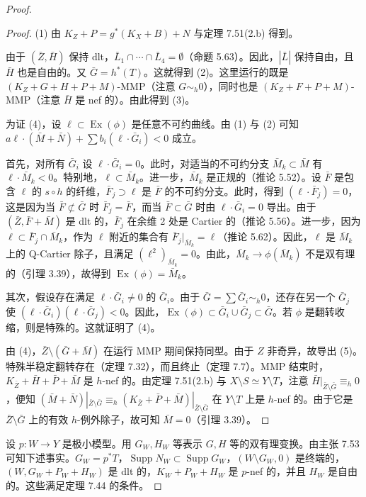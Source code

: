 \begin{proof}
\begin{proof}
(1) 由 $K_Z+P=g^*(K_X+B)+N$ 与定理 7.51(2.b) 得到。

由于 $(\bar Z,\bar H)$ 保持 dlt，$\bar L_1\cap\cdots\cap\bar L_4=\emptyset$（命题 5.63）。因此，$|\bar L|$ 保持自由，且 $\bar H$ 也是自由的。又 $\bar G=h^*(T)$。这就得到 (2)。这里运行的既是 $(K_Z+G+H+P+M)$-MMP（注意 $G\sim_h0$），同时也是 $(K_Z+F+P+M)$-MMP（注意 $\bar H$ 是 nef 的）。由此得到 (3)。

为证 (4)，设 $\ell\subset\operatorname{Ex}(\phi)$ 是任意不可约曲线。由 (1) 与 (2) 可知 $a\ell\cdot(\bar M+\bar N)+\sum b_i(\ell\cdot\bar G_i)<0$ 成立。

首先，对所有 $\bar G_i$ 设 $\ell\cdot\bar G_i=0$。此时，对适当的不可约分支 $\bar M_k\subset\bar M$ 有 $\ell\cdot\bar M_k<0$。特别地，$\ell\subset\bar M_k$。进一步，$\bar M_k$ 是正规的（推论 5.52）。设 $\bar F$ 是包含 $\ell$ 的 $s\circ h$ 的纤维，$\bar F_j\supset\ell$ 是 $\bar F$ 的不可约分支。此时，得到 $(\ell\cdot\bar F_j)=0$，这是因为当 $\bar F\not\subset\bar G$ 时 $\bar F_j=\bar F$，而当 $\bar F\subset\bar G$ 时由 $\ell\cdot\bar G_i=0$ 导出。由于 $(\bar Z,\bar F+\bar M)$ 是 dlt 的，$\bar F_j$ 在余维 2 处是 Cartier 的（推论 5.56）。进一步，因为 $\ell\subset\bar F_j\cap\bar M_k$，作为 $\ell$ 附近的集合有 $\bar F_j|_{\bar M_k}=\ell$（推论 5.62）。因此，$\ell$ 是 $\bar M_k$ 上的 Q-Cartier 除子，且满足 $(\ell^2)_{\bar M_k}=0$。由此，$\bar M_k\to\phi(\bar M_k)$ 不是双有理的（引理 3.39），故得到 $\operatorname{Ex}(\phi)=\bar M_k$。

其次，假设存在满足 $\ell\cdot\bar G_i\ne0$ 的 $\bar G_i$。由于 $\bar G=\sum\bar G_i\sim_h0$，还存在另一个 $\bar G_j$ 使 $(\ell\cdot\bar G_i)(\ell\cdot\bar G_j)<0$。因此，$\operatorname{Ex}(\phi)\subset\bar G_i\cup\bar G_j\subset\bar G$。若 $\phi$ 是翻转收缩，则是特殊的。这就证明了 (4)。

由 (4)，$\bar Z\setminus(\bar G+\bar M)$ 在运行 MMP 期间保持同型。由于 $Z$ 非奇异，故导出 (5)。特殊半稳定翻转存在（定理 7.32），而且终止（定理 7.7）。MMP 结束时，$K_{\bar Z}+\bar H+\bar P+\bar M$ 是 $h$-nef 的。由定理 7.51(2.b) 与 $X\setminus S\simeq Y\setminus T$，注意 $\bar H|_{\bar Z\setminus\bar G}\equiv_h0$，便知 $(\bar M+\bar N)|_{\bar Z\setminus\bar G}\equiv_h(K_{\bar Z}+\bar P+\bar M)|_{\bar Z\setminus\bar G}$ 在 $Y\setminus T$ 上是 $h$-nef 的。由于它是 $\bar Z\setminus\bar G$ 上的有效 $h$-例外除子，故可知 $\bar M=0$（引理 3.39）。
\end{proof}

设 $p\colon W\to Y$ 是极小模型。用 $G_W,H_W$ 等表示 $G,H$ 等的双有理变换。由主张 7.53 可知下述事实。$G_W=p^*T$，$\operatorname{Supp}N_W\subset\operatorname{Supp}G_W$，$(W\setminus G_W,0)$ 是终端的，$(W,G_W+P_W+H_W)$ 是 dlt 的，$K_W+P_W+H_W$ 是 $p$-nef 的，并且 $H_W$ 是自由的。这些满足定理 7.44 的条件。


\end{proof}
